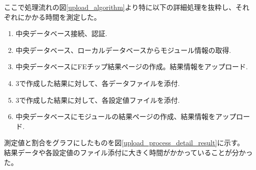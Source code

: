 ここで処理流れの図\ref{upload_algorithm}より特に以下の詳細処理を抜粋し、それぞれにかかる時間を測定した。

\begin{enumerate}
  \item 中央データベース接続、認証.
  \item 中央データベース、ローカルデータベースからモジュール情報の取得.
  \item 中央データベースにFEチップ結果ページの作成。結果情報をアップロード.
  \item 3で作成した結果に対して、各データファイルを添付.
  \item 3で作成した結果に対して、各設定値ファイルを添付.
  \item 中央データベースにモジュールの結果ページの作成、結果情報をアップロード.
\end{enumerate}

測定値と割合をグラフにしたものを図\ref{upload_process_detail_result}に示す。
結果データや各設定値のファイル添付に大きく時間がかかっていることが分かった。

